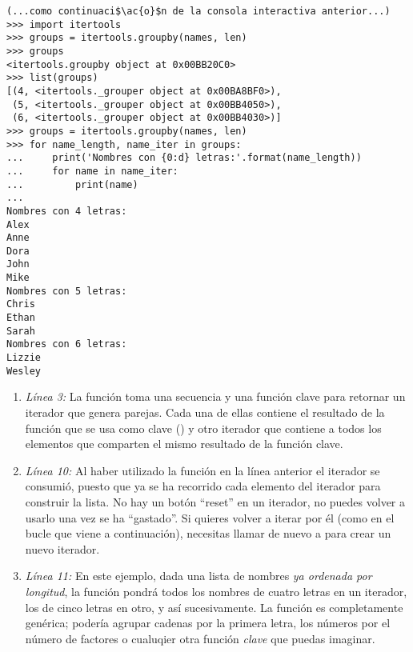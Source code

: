\noindent\begin{minipage}{\textwidth}
\begin{lstlisting}[mathescape=True]
(...como continuaci$\ac{o}$n de la consola interactiva anterior...)
>>> import itertools
>>> groups = itertools.groupby(names, len)
>>> groups
<itertools.groupby object at 0x00BB20C0>
>>> list(groups)
[(4, <itertools._grouper object at 0x00BA8BF0>),
 (5, <itertools._grouper object at 0x00BB4050>),
 (6, <itertools._grouper object at 0x00BB4030>)]
>>> groups = itertools.groupby(names, len)
>>> for name_length, name_iter in groups:
...     print('Nombres con {0:d} letras:'.format(name_length))
...     for name in name_iter:
...         print(name)
... 
Nombres con 4 letras:
Alex
Anne
Dora
John
Mike
Nombres con 5 letras:
Chris
Ethan
Sarah
Nombres con 6 letras:
Lizzie
Wesley
\end{lstlisting}
\end{minipage}

\begin{enumerate}

\item \emph{Línea 3:} La función  toma una secuencia y una función clave para retornar un iterador que genera parejas. Cada una de ellas contiene el resultado de la función que se usa como clave () y otro iterador que contiene a todos los elementos que comparten el mismo resultado de la función clave.

\item \emph{Línea 10:} Al haber utilizado la función  en la línea anterior el iterador se consumió, puesto que ya se ha recorrido cada elemento del iterador para construir la lista. No hay un botón ``reset'' en un iterador, no puedes volver a usarlo una vez se ha ``gastado''. Si quieres volver a iterar por él (como en el bucle  que viene a continuación), necesitas llamar de nuevo a  para crear un nuevo iterador.

\item \emph{Línea 11:} En este ejemplo, dada una lista de nombres \emph{ya ordenada por longitud}, la función  pondrá todos los nombres de cuatro letras en un iterador, los de cinco letras en otro, y así sucesivamente. La función  es completamente genérica; podería agrupar cadenas por la primera letra, los números por el número de factores o cualuqier otra función \emph{clave} que puedas imaginar.

\end{enumerate}

